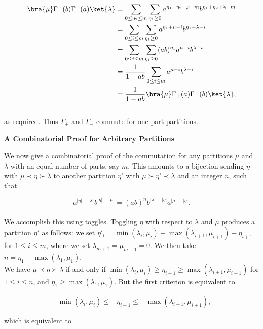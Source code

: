 \begin{align*}
	\bra{\mu} \Gamma_-(b) \Gamma_+(a) \ket{\lambda} &= \sum_{0 \leq \eta_2 \leq m} \sum_{\eta_1 \geq 0} a^{\eta_1 + \eta_2 + \mu - m} b^{\eta_1 + \eta_2 + \lambda - m}\\
	&= \sum_{0 \leq i \leq m} \sum_{\eta_1 \geq 0} a^{\eta_1 + \mu - i} b^{\eta_1 + \lambda - i}\\
	&= \sum_{0 \leq i \leq m} \sum_{\eta_1 \geq 0} (ab)^{\eta_1} a^{\mu - i} b^{\lambda - i}\\
	&= \frac{1}{1 - ab} \sum_{0 \leq i \leq m} a^{\mu - i} b^{\lambda - i}\\
	&= \frac{1}{1 - ab} \bra{\mu} \Gamma_+(a) \Gamma_-(b) \ket{\lambda},
\end{align*}
~\\
as required. Thus $\Gamma_+$ and $\Gamma_-$ commute for one-part partitions.

\vspace{.5in}

\Large \textbf{A Combinatorial Proof for Arbitrary Partitions}\\

\normalsize

We now give a combinatorial proof of the commutation for any partitions $\mu$ and $\lambda$ with an equal number of parts, say $m$. This amounts to a bijection sending $\eta$ with $\mu \prec \eta \succ \lambda$ to another partition $\eta'$ with $\mu \succ \eta' \prec \lambda$ and an integer $n$, such that

$$
	a^{|\eta| - |\lambda|} b^{|\eta| - |\mu|} = (ab)^n b^{|\lambda| - |\eta|} a^{|\mu| - |\eta|}.
$$
~\\
We accomplish this using toggles. Toggling $\eta$ with respect to $\lambda$ and $\mu$ produces a partition $\eta'$ as follows: we set $\eta'_i = \min(\lambda_i, \mu_i) + \max(\lambda_{i + 1}, \mu_{i + 1}) - \eta_{i + 1}$ for $1 \leq i \leq m$, where we set $\lambda_{m + 1} = \mu_{m + 1} = 0$. We then take $n = \eta_1 - \max(\lambda_1, \mu_1)$.\\

We have $\mu \prec \eta \succ \lambda$ if and only if $\min(\lambda_i, \mu_i) \geq \eta_{i + 1} \geq \max(\lambda_{i + 1}, \mu_{i + 1})$ for $1 \leq i \leq n$, and $\eta_1 \geq \max(\lambda_1, \mu_1)$. But the first criterion is equivalent to

$$
	-\min(\lambda_i, \mu_i) \leq -\eta_{i + 1} \leq -\max(\lambda_{i + 1}, \mu_{i + 1}),
$$

which is equivalent to

